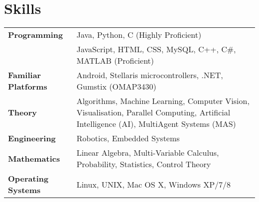 \documentclass[10pt, a4paper]{report}
\newcommand{\teaching}[1]{}
\newcommand{\engineering}[1]{}
\renewcommand{\teaching}[1]{#1}
\renewcommand{\engineering}[1]{#1}
\newcommand{\sk}[3]{\subsubsection*{#1} {#2}{#3}}
\begin{document}
\section*{Skills}
\begin{tabular}{lp{14cm}}
{\bf Programming} &  Java, Python, C (Highly Proficient) \\  \addlinespace
{\bf } &  JavaScript, HTML, CSS, MySQL, C{\footnotesize ++}, C{\footnotesize \#}, MATLAB (Proficient) \\  \addlinespace
{\bf Familiar Platforms} & Android, Stellaris microcontrollers, .NET, Gumstix (OMAP3430)  \\ \addlinespace
{\bf Theory} & Algorithms, Machine Learning, Computer Vision, Visualisation, Parallel Computing, Artificial Intelligence (AI), Multi\-Agent Systems (MAS) \\  \addlinespace
{\bf Engineering} & Robotics, Embedded Systems \\  \addlinespace
{\bf Mathematics} & Linear Algebra,  Multi-Variable Calculus, Probability, Statistics, Control Theory \\  \addlinespace
{\bf Operating Systems} &  Linux, UNIX, Mac OS X, Windows XP/7/8
\end{tabular}
\end{document}
